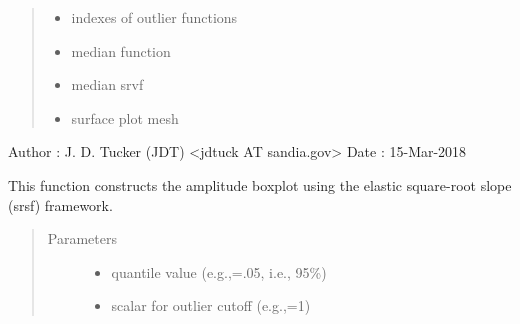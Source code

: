 \documentclass[letterpaper,10pt,english]{sphinxmanual}
\begin{document}
\begin{fulllineitems}
\begin{quote}
\begin{description}
\begin{itemize}
\item {} 
 \textendash{} indexes of outlier functions

\item {} 
 \textendash{} median function

\item {} 
 \textendash{} median srvf

\item {} 
 \textendash{} surface plot mesh

\end{itemize}

\end{description}\end{quote}

Author :  J. D. Tucker (JDT) \textless{}jdtuck AT sandia.gov\textgreater{}
Date   :  15-Mar-2018

\begin{fulllineitems}
\label{\detokenize{boxplots:boxplots.ampbox.construct_boxplot}}
This function constructs the amplitude boxplot using the elastic
square-root slope (srsf) framework.
\begin{quote}\begin{description}
\item[{Parameters}] \leavevmode\begin{itemize}
\item {} 
 \textendash{} quantile value (e.g.,=.05, i.e., 95\%)

\item {} 
 \textendash{} scalar for outlier cutoff (e.g.,=1)

\end{itemize}

\end{description}\end{quote}

\end{fulllineitems}


\end{fulllineitems}
\end{document}
